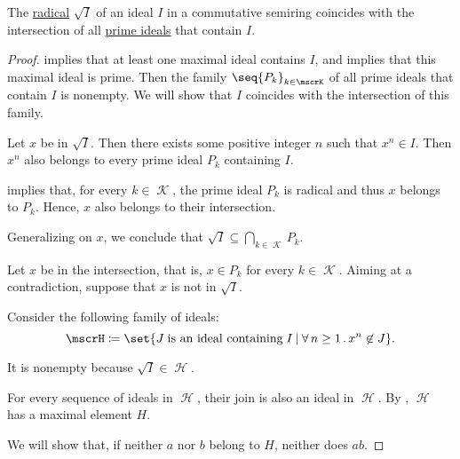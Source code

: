 \begin{proposition}\label{thm:radical_ideal_is_intersection}
  The \hyperref[def:radical_of_ideal]{radical} \( \sqrt I \) of an ideal \( I \) in a commutative semiring coincides with the intersection of all \hyperref[def:semiring_ideal/prime]{prime ideals} that contain \( I \).
\end{proposition}
\begin{proof}
    implies that at least one maximal ideal contains \( I \), and  implies that this maximal ideal is prime. Then the family \( \seq{ P_k }_{k \in \mscrK} \) of all prime ideals that contain \( I \) is nonempty. We will show that \( I \) coincides with the intersection of this family.

   Let \( x \) be in \( \sqrt I \). Then there exists some positive integer \( n \) such that \( x^n \in I \). Then \( x^n \) also belongs to every prime ideal \( P_k \) containing \( I \).

   implies that, for every \( k \in \mscrK \), the prime ideal \( P_k \) is radical and thus \( x \) belongs to \( P_k \). Hence, \( x \) also belongs to their intersection.

  Generalizing on \( x \), we conclude that \( \sqrt I \subseteq \bigcap_{k \in \mscrK} P_k \).

   Let \( x \) be in the intersection, that is, \( x \in P_k \) for every \( k \in \mscrK \). Aiming at a contradiction, suppose that \( x \) is not in \( \sqrt I \).

  Consider the following family of ideals:
  \begin{equation*}
    \mscrH \coloneqq \set{ J \T{is an ideal containing} I \given \qforall {n \geq 1} x^n \not\in J }.
  \end{equation*}

  It is nonempty because \( \sqrt I \in \mscrH \).

  For every sequence of ideals in \( \mscrH \), their join is also an ideal in \( \mscrH \). By , \( \mscrH \) has a maximal element \( H \).

   We will show that, if neither \( a \) nor \( b \) belong to \( H \), neither does \( ab \).


\end{proof}
